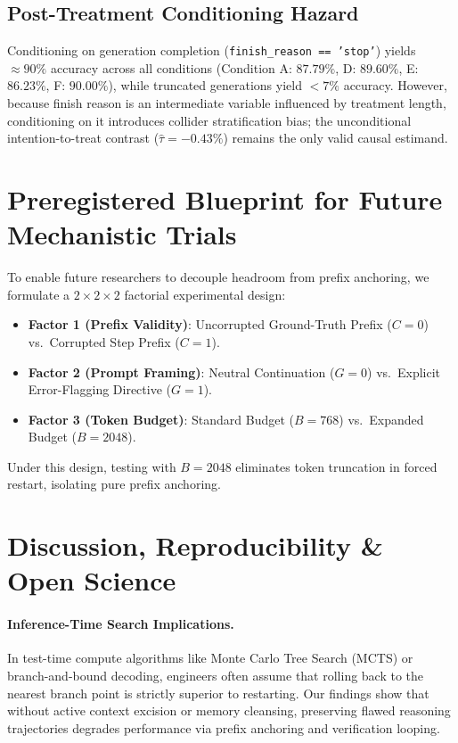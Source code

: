 \documentclass[11pt]{article}
\begin{document}
\subsection{Post-Treatment Conditioning Hazard}
Conditioning on generation completion (\texttt{finish\_reason == 'stop'}) yields $\approx 90\%$ accuracy across all conditions (Condition A: $87.79\%$, D: $89.60\%$, E: $86.23\%$, F: $90.00\%$), while truncated generations yield $<7\%$ accuracy. However, because finish reason is an intermediate variable influenced by treatment length, conditioning on it introduces collider stratification bias; the unconditional intention-to-treat contrast ($\hat{\tau} = -0.43\%$) remains the only valid causal estimand.

\section{Preregistered Blueprint for Future Mechanistic Trials}
\label{sec:future_blueprint}

To enable future researchers to decouple headroom from prefix anchoring, we formulate a $2 \times 2 \times 2$ factorial experimental design:
\begin{itemize}
    \item \textbf{Factor 1 (Prefix Validity)}: Uncorrupted Ground-Truth Prefix ($C=0$) vs.\ Corrupted Step Prefix ($C=1$).
    \item \textbf{Factor 2 (Prompt Framing)}: Neutral Continuation ($G=0$) vs.\ Explicit Error-Flagging Directive ($G=1$).
    \item \textbf{Factor 3 (Token Budget)}: Standard Budget ($B=768$) vs.\ Expanded Budget ($B=2048$).
\end{itemize}
Under this design, testing with $B=2048$ eliminates token truncation in forced restart, isolating pure prefix anchoring.

\section{Discussion, Reproducibility \& Open Science}
\label{sec:discussion}

\paragraph{Inference-Time Search Implications.}
In test-time compute algorithms like Monte Carlo Tree Search (MCTS) or branch-and-bound decoding, engineers often assume that rolling back to the nearest branch point is strictly superior to restarting. Our findings show that without active context excision or memory cleansing, preserving flawed reasoning trajectories degrades performance via prefix anchoring and verification looping.
\end{document}
